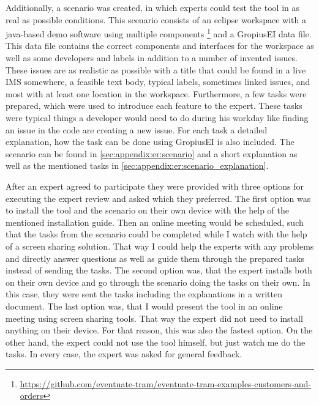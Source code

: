 Additionally, a scenario was created, in which experts could test the tool in as real as possible conditions.
This scenario consists of an eclipse workspace with a java-based demo software using multiple components \footnote{\url{https://github.com/eventuate-tram/eventuate-tram-examples-customers-and-orders}} and a \gls{GropiusEI} data file.
This data file contains the correct components and interfaces for the workspace as well as some developers and labels in addition to
a number of invented issues.
These issues are as realistic as possible with a title that could be found in a live \gls{IMS} somewhere, a feasible text body,
typical labels, sometimes linked issues, and most with at least one location in the workspace.
Furthermore, a few tasks were prepared, which were used to introduce each feature to the expert.
These tasks were typical things a developer would need to do during his workday like finding an issue in the code are creating a new issue.
For each task a detailed explanation, how the task can be done using \gls{GropiusEI} is also included. 
The scenario can be found in \cref{sec:appendix:er:scenario} and a short explanation as well as the mentioned tasks in \cref{sec:appendix:er:scenario_explanation}.

After an expert agreed to participate they were provided with three options for executing the expert review and asked which they preferred.
The first option was to install the tool and the scenario on their own device with the help of the mentioned installation guide.
Then an online meeting would be scheduled, such that the tasks from the scenario could be completed while I watch with the help of a screen sharing solution. That way I could help the experts with any problems and directly answer questions as well as guide them through the prepared tasks instead of sending the tasks.
The second option was, that the expert installs both on their own device and go through the scenario doing the tasks on their own.
In this case, they were sent the tasks including the explanations in a written document.
The last option was, that I would present the tool in an online meeting using screen sharing tools. That way the expert did not need to install anything on their device. For that reason, this was also the fastest option. On the other hand, the expert could not use the tool himself, but just watch me do the tasks.
In every case, the expert was asked for general feedback.


